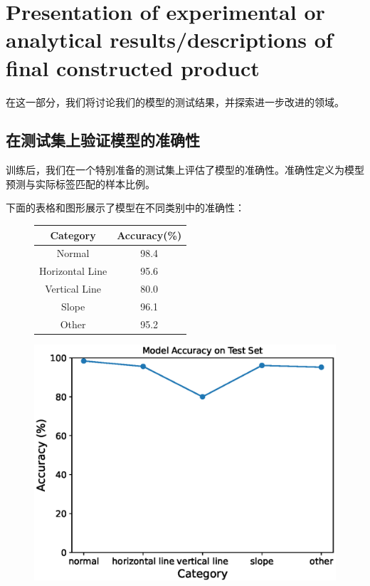 \section{Presentation of experimental or analytical results/descriptions of final constructed product}

在这一部分，我们将讨论我们的模型的测试结果，并探索进一步改进的领域。

\subsection{在测试集上验证模型的准确性}

训练后，我们在一个特别准备的测试集上评估了模型的准确性。准确性定义为模型预测与实际标签匹配的样本比例。

下面的表格和图形展示了模型在不同类别中的准确性：

\begin{figure}[htbp]
    \centering
    \begin{minipage}{0.45\textwidth}
        \centering
        \begin{tabular}{cc}
            \toprule
            Category & Accuracy(\%) \\
            \midrule
            Normal & 98.4 \\
            Horizontal Line & 95.6 \\
            Vertical Line & 80.0 \\
            Slope & 96.1 \\
            Other & 95.2 \\
            \bottomrule
        \end{tabular}
        \label{tab:model_accuracy}
    \end{minipage}
    \begin{minipage}{0.45\textwidth}
        \centering
        \includegraphics[width=\textwidth]{./fig/assistplot/accuracy.eps}
        \label{fig:accuracy_histogram}
    \end{minipage}
\end{figure}


